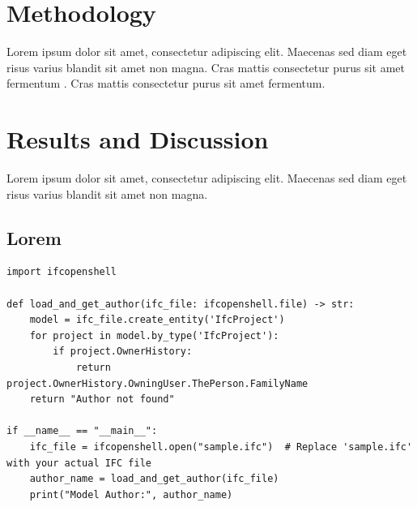 \section{Methodology}
Lorem ipsum dolor sit amet, consectetur adipiscing elit. Maecenas sed diam eget risus varius blandit sit amet non magna. Cras mattis consectetur purus sit amet fermentum \parencite{sample_citation2}.  Cras mattis consectetur purus sit amet fermentum. 


\section{Results and Discussion}
Lorem ipsum dolor sit amet, consectetur adipiscing elit. Maecenas sed diam eget risus varius blandit sit amet non magna. 




\subsection{Lorem}
\lipsum[2]  %
\begin{lstlisting}[caption={My Code Listing}, label=lst_my_code]
import ifcopenshell

def load_and_get_author(ifc_file: ifcopenshell.file) -> str:
    model = ifc_file.create_entity('IfcProject')
    for project in model.by_type('IfcProject'):
        if project.OwnerHistory:
            return project.OwnerHistory.OwningUser.ThePerson.FamilyName
    return "Author not found"

if __name__ == "__main__":
    ifc_file = ifcopenshell.open("sample.ifc")  # Replace 'sample.ifc' with your actual IFC file
    author_name = load_and_get_author(ifc_file)
    print("Model Author:", author_name)
\end{lstlisting}
\lipsum[2]  %

\printbibliography 

